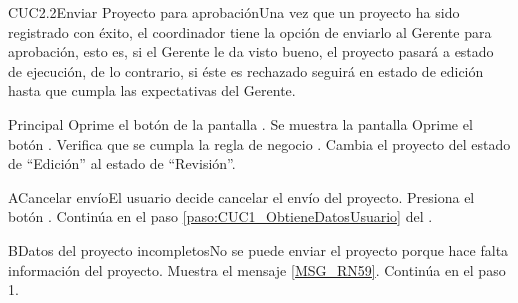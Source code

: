 
\begin{UseCase}{CUC2.2}{Enviar Proyecto para aprobación}{Una vez que un proyecto ha sido registrado con éxito, el coordinador tiene la opción de enviarlo al Gerente para aprobación, esto es, si el Gerente le da visto bueno, el proyecto pasará a estado de ejecución, de lo contrario, si éste es rechazado seguirá en estado de edición hasta que cumpla las expectativas del Gerente.}
\end{UseCase}
	
	
\begin{UCtrayectoria}{Principal}
		\UCpaso[\UCactor] Oprime el botón  de la pantalla .
		\UCpaso Se muestra la pantalla 
		\UCpaso[\UCactor] Oprime el botón . 
		\UCpaso Verifica que se cumpla la regla de negocio . 
		\UCpaso Cambia el proyecto del estado de ``Edición'' al estado de ``Revisión''.
\end{UCtrayectoria}

\begin{UCtrayectoriaA}{A}{Cancelar envío}{El usuario decide cancelar el envío del proyecto.}
			\UCpaso[\UCactor] Presiona el botón .
			\UCpaso Continúa en el paso \ref{paso:CUC1_ObtieneDatosUsuario} del  .
\end{UCtrayectoriaA}

\begin{UCtrayectoriaA}{B}{Datos del proyecto incompletos}{No se puede enviar el proyecto porque hace falta información del proyecto.}
			\UCpaso Muestra el mensaje \ref{MSG_RN59}.
			\UCpaso Continúa en el paso 1.
\end{UCtrayectoriaA}

